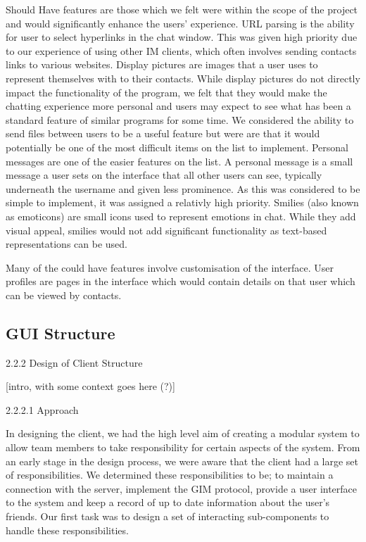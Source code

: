 Should Have features are those which we felt were within the scope of the project and would significantly enhance the users' experience. URL parsing is the ability for user to select hyperlinks in the chat window. This was given high priority due to our experience of using other IM clients, which often involves sending contacts links to various websites. Display pictures are images that a user uses to represent themselves with to their contacts. While display pictures do not directly impact the functionality of the program, we felt that they would make the chatting experience more personal and users may expect to see what has been a standard feature of similar programs for some time. We considered the ability to send files between users to be a useful feature but were are that it would potentially be one of the most difficult items on the list to implement. Personal messages are one of the easier features on the list. A personal message is a small message a user sets on the interface that all other users can see, typically underneath the username and given less prominence. As this was considered to be simple to implement, it was assigned a relativly high priority. Smilies (also known as emoticons) are small icons used to represent emotions in chat. While they add visual appeal, smilies would not add significant functionality as text-based representations can be used.

Many of the could have features involve customisation of the interface. User profiles are pages in the interface which would contain details on that user which can be viewed by contacts. 

\subsection{GUI Structure}
2.2.2 Design of Client Structure

[intro, with some context goes here (?)]

2.2.2.1 Approach

In designing the client, we had the high level aim of creating a modular system to allow team members to take responsibility for certain aspects of the system. From an early stage in the design process, we were aware that the client had a large set of responsibilities. We determined these responsibilities to be;  to maintain a connection with the server, implement the GIM protocol, provide a user interface to the system and keep a record of up to date information about the user’s friends. Our first task was to design a set of interacting sub-components to handle these responsibilities.

